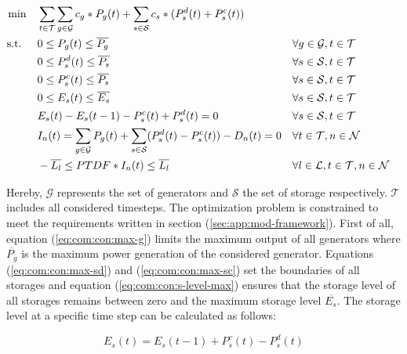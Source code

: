 \begin{subequations}
	\begin{align}
		 \min \quad & \sum_{t\in\mathcal{T}}\sum_{g\in\mathcal{G}}c_g*P_g(t) + \sum_{s\in\mathcal{S}}c_s*(P_s^d(t)+P_s^c(t))\\
		 \text{s.t. } \quad & 0 \leq P_g(t) \leq \overline{P_g} && \forall g \in \mathcal{G}, t \in \mathcal{T} \label{eq:com:con:max-g}\\
		 & 0 \leq P_s^d(t) \leq \overline{P_s} && \forall s \in \mathcal{S}, t \in \mathcal{T} \label{eq:com:con:max-sd}\\
		 & 0 \leq P_s^c(t) \leq \overline{P_s} && \forall s \in \mathcal{S}, t \in \mathcal{T} \label{eq:com:con:max-sc}\\
		 & 0 \leq E_s(t) \leq \overline{E_s} && \forall s \in \mathcal{S}, t \in \mathcal{T} \label{eq:com:con:s-level-max}\\
		 & E_s(t) - E_s(t-1) - P_s^c(t) + P_s^d(t) = 0 && \forall s \in \mathcal{S}, t \in \mathcal{T} \label{eq:com:con:s-level}\\
		 & I_n(t) = \sum_{g\in\mathcal{G}}P_g(t) + \sum_{s\in\mathcal{S}}(P_s^d(t)-P_s^c(t))-D_n(t) = 0 && \forall t \in \mathcal{T}, n \in \mathcal{N} \label{eq:com:con:eb}\\
		 & -\overline{L_l} \leq PTDF * I_n(t) \leq \overline{L_l} && \forall l \in \mathcal{L}, t \in \mathcal{T}, n \in \mathcal{N} \label{eq:com:con:pf}
	\end{align}
\end{subequations}

Hereby, $\mathcal{G}$ represents the set of generators and $\mathcal{S}$ the set of storage respectively. $\mathcal{T}$ includes all considered timesteps. The optimization problem is constrained to meet the requirements written in section (\ref{sec:app:mod-framework}). First of all, equation (\ref{eq:com:con:max-g}) limits the maximum output of all generators where $\overline{P_g}$ is the maximum power generation of the considered generator. Equations (\ref{eq:com:con:max-sd}) and (\ref{eq:com:con:max-sc}) set the boundaries of all storages and equation (\ref{eq:com:con:s-level-max}) ensures that the storage level of all storages remains between zero and the maximum storage level $\overline{E_s}$. The storage level at a specific time step can be calculated as follows:

\begin{equation}
	\label{eq:storage-level}
	E_s(t) = E_s(t-1) + P_s^c(t) - P_s^d(t)
\end{equation}

